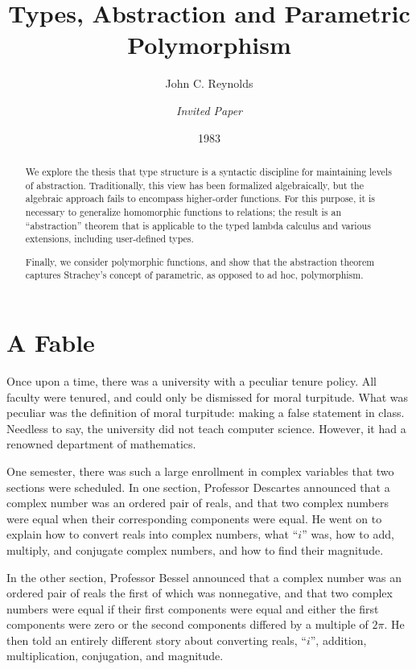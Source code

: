 \documentclass[sigplan,screen,nonacm,balance=false]{acmart}
\title{Types, Abstraction and Parametric Polymorphism}
\date{1983}
\author{John C. Reynolds}
\affiliation{
  \institution{Syracuse University}
  \city{Syracuse}
  \state{New York}
  \country{USA}
}
\author{\texorpdfstring{\null\hfill}{}\textit{Invited Paper}} %
\theoremstyle{plain}
\begin{document}
\fancyhf{}
\fancyhead[RO]{\thepage}
\fancyhead[LE]{\thepage}

\maketitle
\thispagestyle{first}

\setlength{\parskip}{.5\baselineskip plus 2pt}

\begin{abstract}
  We explore the thesis that type structure is a syntactic discipline for maintaining levels of abstraction.
  Traditionally, this view has been formalized algebraically, but the algebraic approach fails to encompass higher-order functions.
  For this purpose, it is necessary to generalize homomorphic functions to relations;
  the result is an ``abstraction'' theorem that is applicable to the typed lambda calculus and various extensions, including user-defined types.

  Finally, we consider polymorphic functions, and show that the abstraction theorem captures Strachey's concept of parametric, as opposed to ad hoc, polymorphism.
\end{abstract}

\section{A Fable}

Once upon a time, there was a university with a peculiar tenure policy.
All faculty were tenured, and could only be dismissed for moral turpitude.
What was peculiar was the definition of moral turpitude:
making a false statement in class.
Needless to say, the university did not teach computer science.
However, it had a renowned department of mathematics.

One semester, there was such a large enrollment in complex variables that two sections were scheduled.
In one section, Professor Descartes announced that a complex number was an ordered pair of reals, and that two complex numbers were equal when their corresponding components were equal.
He went on to explain how to convert reals into complex numbers, what ``$i$'' was, how to add, multiply, and conjugate complex numbers, and how to find their magnitude.

In the other section, Professor Bessel announced that a complex number was an ordered pair of reals the first of which was nonnegative, and that two complex numbers were equal if their first components were equal and either the first components were zero or the second components differed by a multiple of $2\pi$.
He then told an entirely different story about converting reals, ``$i$'', addition, multiplication, conjugation, and magnitude.
\end{document}
